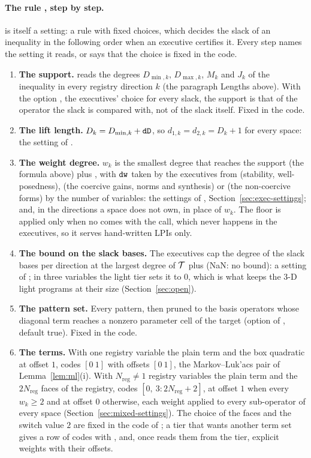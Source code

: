 \paragraph{The rule , step by step.}  is itself a setting: a rule with fixed choices, which decides the slack of an inequality in the following order when an executive certifies it. Every step names the setting it reads, or says that the choice is fixed in the code.
\begin{enumerate}\setlength\itemsep{0pt}
\item \textbf{The support.}  reads the degrees $D_{\min,k}$, $D_{\max,k}$, $M_k$ and $J_k$ of the inequality in every registry direction $k$ (the paragraph Lengths above). With the option , the executives' choice for every slack, the support is that of the operator the slack is compared with, not of the slack itself. Fixed in the code.
\item \textbf{The lift length.} $D_k=D_{\min,k}+\texttt{dD}$, so $d_{1,k}=d_{2,k}=D_k+1$ for every space: the setting  of .
\item \textbf{The weight degree.} $w_k$ is the smallest degree that reaches the support (the formula above) plus , with $\texttt{dw}$ taken by the executives from  (stability, well-posedness),  (the coercive gains, norms and synthesis) or  (the non-coercive forms) by the number of variables: the settings of , Section~\ref{sec:exec-settings}; and, in the directions a space does not own,  in place of $w_k$. The floor  is applied only when no  comes with the call, which never happens in the executives, so it serves hand-written LPIs only.
\item \textbf{The bound on the slack bases.} The executives cap the degree of the slack bases per direction at the largest degree of $\mathcal{T}$ plus  (NaN: no bound): a setting of ; in three variables the light tier sets it to $0$, which is what keeps the 3-D light programs at their size (Section~\ref{sec:open}).
\item \textbf{The pattern set.} Every pattern, then pruned to the basis operators whose diagonal term reaches a nonzero parameter cell of the target (option  of , default true). Fixed in the code.
\item \textbf{The terms.} With one registry variable the plain term and the box quadratic at offset $1$, codes $[0\ 1]$ with offsets $[0\ 1]$, the Markov--Luk'acs pair of Lemma~\ref{lem:ml}(i). With $N_{\mathrm{reg}}\ne1$ registry variables the plain term and the $2N_{\mathrm{reg}}$ faces of the registry, codes $[0,\ 3{:}2N_{\mathrm{reg}}+2]$, at offset $1$ when every $w_k\ge2$ and at offset $0$ otherwise, each weight applied to every sub-operator of every space (Section~\ref{sec:mixed-settings}). The choice of the faces and the switch value $2$ are fixed in the code of ; a tier that wants another term set gives  a row of codes with , and, once  reads them from the tier, explicit weights with their offsets.

\end{enumerate}
